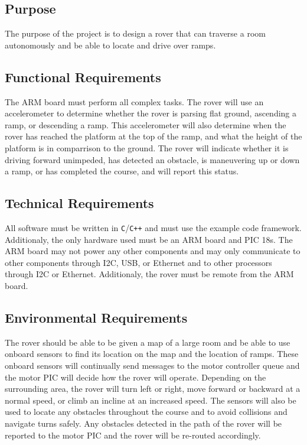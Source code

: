 









\subsection*{Purpose}
The purpose of the project is to design a rover that can traverse a room autonomously and be able to locate and drive over ramps.

\subsection*{Functional Requirements}
The ARM board must perform all complex tasks.  The rover will use an accelerometer to determine whether the rover is parsing flat ground, ascending a ramp, or descending a ramp.  This accelerometer will also determine when the rover has reached the platform at the top of the ramp, and what the height of the platform is in comparrison to the ground.  The rover will indicate whether it is driving forward unimpeded, has detected an obstacle, is maneuvering up or down a ramp, or has completed the course, and will report this status.

\subsection*{Technical Requirements}
All software must be written in \texttt{C}/\texttt{C++} and must use the example code framework. Additionaly, the only hardware used must be an ARM board and PIC 18s. The ARM board may not power any other components and may only communicate to other components through I2C, USB, or Ethernet and to other processors through I2C or Ethernet. Additionaly, the rover must be remote from the ARM board.

\subsection*{Environmental Requirements}
The rover should be able to be given a map of a large room and be able to use onboard sensors to find its location on the map and the location of ramps. These onboard sensors will continually send messages to the motor controller queue and the motor PIC will decide how the rover will operate. Depending on the surrounding area, the rover will turn left or right, move forward or backward at a normal speed, or climb an incline at an increased speed.  The sensors will also be used to locate any obstacles throughout the course and to avoid collisions and navigate turns safely.  Any obstacles detected in the path of the rover will be reported to the motor PIC and the rover will be re-routed accordingly. 


